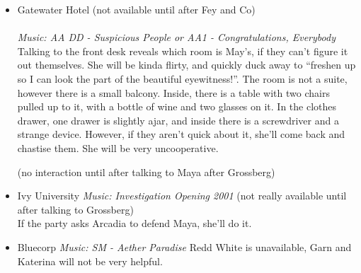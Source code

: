 \begin{itemize}
\item Gatewater Hotel
(not available until after Fey and Co)\\
\\
\textit{Music: AA DD - Suspicious People or AA1 - Congratulations, Everybody}\\	
Talking to the front desk reveals which room is May's, if they can't figure it out themselves. She will be kinda flirty, and quickly  duck away to ``freshen up so I can look the part of the beautiful eyewitness!''. The room is not a suite, however there is a small balcony. Inside, there is a table with two chairs pulled up to it, with a bottle of wine and two glasses on it. In the clothes drawer, one drawer is slightly ajar, and inside there is a screwdriver and a strange device. However, if they aren't quick about it, she'll come back and chastise them. She will be very uncooperative.

(no interaction until after talking to Maya after Grossberg)

\item Ivy University
\textit{Music: Investigation Opening 2001}
(not really available until after talking to Grossberg)\\
If the party asks Arcadia to defend Maya, she'll do it.

\item Bluecorp
\textit{Music: SM - Aether Paradise}
Redd White is unavailable, Garn and Katerina will not be very helpful.

\end{itemize}



